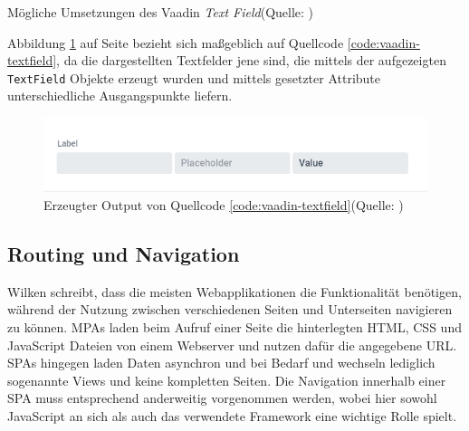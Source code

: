 \documentclass[a4paper,12pt,twoside]{scrreprt}
\begin{document}
\begin{listing}[ht]
    \inputminted[fontsize=\footnotesize,linenos]{java}{code/Vaadin_Text-Field_sample.java}
    \caption[Mögliche Umsetzungen des Vaadin \textit{Text Field}]{Mögliche Umsetzungen des Vaadin \textit{Text Field}\newline(Quelle: \cite[][Basic text field]{vaadin_ltd_java_nodate})}
    \label{code:vaadin-textfield}
\end{listing}

Abbildung \ref{fig:vaadin-textfield-output} auf Seite \pageref{fig:vaadin-textfield-output} bezieht sich maßgeblich auf Quellcode \ref{code:vaadin-textfield}, da die dargestellten Textfelder jene sind, die mittels der aufgezeigten \texttt{TextField} Objekte erzeugt wurden und mittels gesetzter Attribute unterschiedliche Ausgangspunkte liefern.

\begin{figure}[ht]
    \centering
    \includegraphics[scale=0.7]{images/Vaadin_Text-Field-output.png}
    \caption[Erzeugter Output von Quellcode \ref{code:vaadin-textfield}]{Erzeugter Output von Quellcode \ref{code:vaadin-textfield}\newline(Quelle: \cite[][Basic text field]{vaadin_ltd_java_nodate})}
    \label{fig:vaadin-textfield-output}
\end{figure}

\subsection{Routing und Navigation}
\label{sub-sec:routing-navigation}
Wilken schreibt, dass die meisten Webapplikationen die Funktionalität benötigen, während der Nutzung zwischen verschiedenen Seiten und Unterseiten navigieren zu können. \acp{MPA} laden beim Aufruf einer Seite die hinterlegten HTML, \ac{CSS} und JavaScript Dateien von einem Webserver und nutzen dafür die angegebene URL. \acp{SPA} hingegen laden Daten asynchron und bei Bedarf und wechseln lediglich sogenannte Views und keine kompletten Seiten. Die Navigation innerhalb einer \ac{SPA} muss entsprechend anderweitig vorgenommen werden, wobei hier sowohl JavaScript an sich als auch das verwendete Framework eine wichtige Rolle spielt. \parencite[][Seite 159f.]{wilken_angular_2018}
\end{document}

